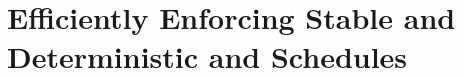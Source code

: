 
\newcommand{\bddbddb}{\vv{bddbddb}\xspace}
\newcommand{\peregrinenprog}[0]{18\xspace}

\chapter{Efficiently Enforcing Stable and Deterministic and Schedules} \label{sec:peregrine}












